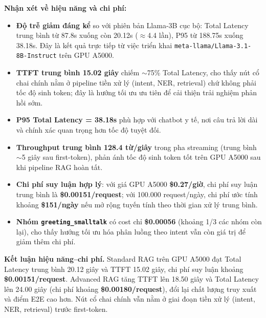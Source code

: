 \noindent\textbf{Nhận xét về hiệu năng và chi phí:}
\begin{itemize}
    \item \textbf{Độ trễ giảm đáng kể} so với phiên bản Llama-3B cục bộ: Total Latency trung bình từ 87.8s xuống còn 20.12s ($\approx$4.4 lần), P95 từ 188.75s xuống 38.18s. Đây là kết quả trực tiếp từ việc triển khai \texttt{meta-llama/Llama-3.1-8B-Instruct} trên GPU A5000.
    \item \textbf{TTFT trung bình 15.02 giây} chiếm $\sim$75\% Total Latency, cho thấy nút cổ chai chính nằm ở pipeline tiền xử lý (intent, NER, retrieval) chứ không phải tốc độ sinh token; đây là hướng tối ưu ưu tiên để cải thiện trải nghiệm phản hồi sớm.
    \item \textbf{P95 Total Latency = 38.18s} phù hợp với chatbot y tế, nơi câu trả lời dài và chính xác quan trọng hơn tốc độ tuyệt đối.
    \item \textbf{Throughput trung bình 128.4 từ/giây} trong pha streaming (trung bình $\sim$5 giây sau first-token), phản ánh tốc độ sinh token tốt trên GPU A5000 sau khi pipeline RAG hoàn tất.
    \item \textbf{Chi phí suy luận hợp lý}: với giá GPU A5000 \textbf{\$0.27/giờ}, chi phí suy luận trung bình là \textbf{\$0.00151/request}; với 100.000 request/ngày, chi phí ước tính khoảng \textbf{\$151/ngày} nếu mở rộng tuyến tính theo thời gian xử lý trung bình.
    \item \textbf{Nhóm \texttt{greeting\_smalltalk}} có cost chỉ \textbf{\$0.00056} (khoảng 1/3 các nhóm còn lại), cho thấy hướng tối ưu hóa phân luồng theo intent vẫn còn giá trị để giảm thêm chi phí.
\end{itemize}

\textbf{Kết luận hiệu năng--chi phí.}
Standard RAG trên GPU A5000 đạt Total Latency trung bình 20.12 giây và TTFT 15.02 giây, chi phí suy luận khoảng \textbf{\$0.00151/request}. Advanced RAG tăng TTFT lên 18.50 giây và Total Latency lên 24.00 giây (chi phí khoảng \textbf{\$0.00180/request}), đổi lại chất lượng truy xuất và điểm E2E cao hơn. Nút cổ chai chính vẫn nằm ở giai đoạn tiền xử lý (intent, NER, retrieval) trước first-token.